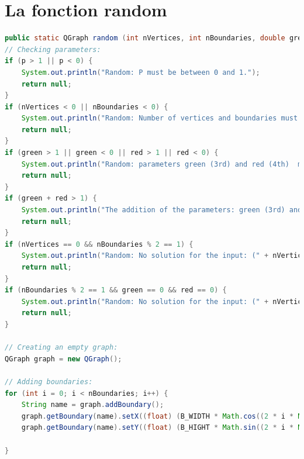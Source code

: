 \documentclass[a4paper,oneside]{book}
\begin{document}
\appendix
{}
\makeatletter
{}
\makeatother

\chapter{La fonction random}
\begin{lstlisting}[language=java]
public static QGraph random (int nVertices, int nBoundaries, double green, double red, double p) {
// Checking parameters:
if (p > 1 || p < 0) {
	System.out.println("Random: P must be between 0 and 1.");
	return null;
}
if (nVertices < 0 || nBoundaries < 0) {
	System.out.println("Random: Number of vertices and boundaries must be positif.");
	return null;
}
if (green > 1 || green < 0 || red > 1 || red < 0) {
	System.out.println("Random: parameters green (3rd) and red (4th)  must be between 0 and 1.");
	return null;
}
if (green + red > 1) {
	System.out.println("The addition of the parameters: green (3rd) and red (4th) must be inferior to 1.");
	return null;
}
if (nVertices == 0 && nBoundaries % 2 == 1) {
	System.out.println("Random: No solution for the input: (" + nVertices + "," + nBoundaries + "," + green + "," + red + "," + p + ").");
	return null;
}
if (nBoundaries % 2 == 1 && green == 0 && red == 0) {
	System.out.println("Random: No solution for the input: (" + nVertices + "," + nBoundaries + "," + green + "," + red + "," + p + ").");
	return null;
}

// Creating an empty graph: 
QGraph graph = new QGraph();

// Adding boundaries:
for (int i = 0; i < nBoundaries; i++) {
	String name = graph.addBoundary();
	graph.getBoundary(name).setX((float) (B_WIDTH * Math.cos((2 * i * Math.PI)/nBoundaries)));
	graph.getBoundary(name).setY((float) (B_HIGHT * Math.sin((2 * i * Math.PI)/nBoundaries)));
	
}


\end{lstlisting}
\end{document}
